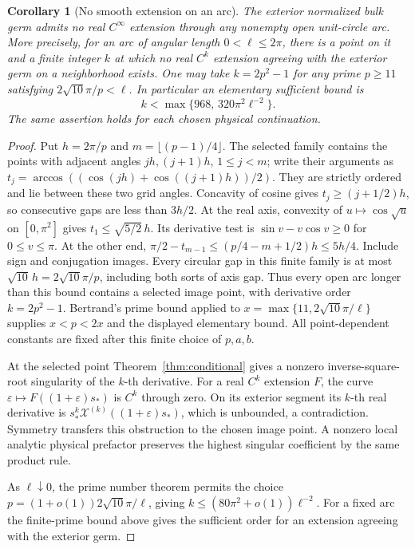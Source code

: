 \documentclass[11pt]{article}
\numberwithin{equation}{section}
\newtheorem{corollary}[theorem]{Corollary}
\theoremstyle{definition}
\newcommand{\eps}{\varepsilon}
\begin{document}
\begin{corollary}[No smooth extension on an arc]\label{cor:smootharc}
The exterior normalized bulk germ admits no real \(C^\infty\)
extension through any nonempty open unit-circle arc. More precisely,
for an arc of angular length \(0<\ell\le2\pi\), there is a point
on it and a finite integer \(k\) at which no real \(C^k\)
extension agreeing with the exterior germ on a neighborhood exists.
One may take \(k=2p^2-1\) for any prime \(p\ge11\) satisfying
\(2\sqrt{10}\pi/p<\ell\). In particular an elementary sufficient
bound is
\[
 k<\max\{968,\,320\pi^2\ell^{-2}\}.
\]
The same assertion holds for each chosen physical continuation.
\end{corollary}
\begin{proof}
Put \(h=2\pi/p\) and \(m=\lfloor(p-1)/4\rfloor\).
The selected family contains the points with adjacent angles
\(jh,(j+1)h\), \(1\le j<m\); write their arguments as
\(t_j=\arccos((\cos(jh)+\cos((j+1)h))/2)\).
They are strictly ordered and lie between these two grid angles.
Concavity of cosine gives \(t_j\ge(j+1/2)h\), so consecutive
gaps are less than \(3h/2\). At the real axis,
convexity of \(u\mapsto\cos\sqrt u\) on \([0,\pi^2]\) gives
\(t_1\le\sqrt{5/2}\,h\). Its derivative test is
\(\sin v-v\cos v\ge0\) for \(0\le v\le\pi\).
At the other end,
\(\pi/2-t_{m-1}\le(p/4-m+1/2)h\le5h/4\).
Include sign and conjugation images. Every circular gap in this
finite family is at most \(\sqrt{10}\,h=2\sqrt{10}\pi/p\),
including both sorts of axis gap. Thus every open arc longer than
this bound contains a selected image point, with derivative order
\(k=2p^2-1\). Bertrand's prime bound applied to
\(x=\max\{11,2\sqrt{10}\pi/\ell\}\) supplies \(x<p<2x\)
and the displayed elementary bound. All point-dependent constants
are fixed after this finite choice of \(p,a,b\).

At the selected point Theorem~\ref{thm:conditional} gives a nonzero
inverse-square-root singularity of the \(k\)-th derivative.
For a real \(C^k\) extension \(F\), the curve
\(\eps\mapsto F((1+\eps)s_*)\) is \(C^k\) through zero.
On its exterior segment its \(k\)-th real derivative is
\(s_*^k\mathcal X^{(k)}((1+\eps)s_*)\), which is unbounded,
a contradiction. Symmetry transfers this obstruction to the chosen
image point. A nonzero local analytic physical prefactor preserves
the highest singular coefficient by the same product rule.

As \(\ell\downarrow0\), the prime number theorem permits the choice
\(p=(1+o(1))2\sqrt{10}\pi/\ell\), giving
\(k\le(80\pi^2+o(1))\ell^{-2}\). For a fixed arc the finite-prime
bound above gives the sufficient order for an extension agreeing
with the exterior germ.
\end{proof}
\end{document}
